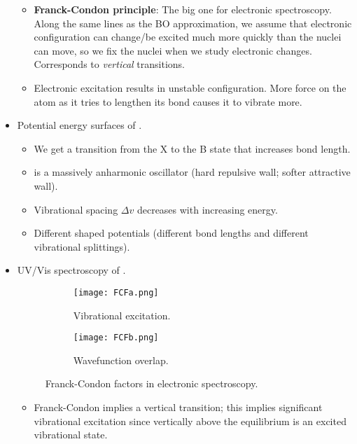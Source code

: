 \documentclass[../notes.tex]{subfiles}
\begin{document}
\begin{itemize}
\begin{itemize}
        \item \textbf{Franck-Condon principle}: The big one for electronic spectroscopy. Along the same lines as the BO approximation, we assume that electronic configuration can change/be excited much more quickly than the nuclei can move, so we fix the nuclei when we study electronic changes. Corresponds to \emph{vertical} transitions.
        \item Electronic excitation results in unstable configuration. More force on the atom as it tries to lengthen its bond causes it to vibrate more.
    \end{itemize}
    \item Potential energy surfaces of .
    \begin{itemize}
        \item We get a transition from the X to the B state that increases bond length.
        \item {} is a massively anharmonic oscillator (hard repulsive wall; softer attractive wall).
        \item Vibrational spacing $\Delta v$ decreases with increasing energy.
        \item Different shaped potentials (different bond lengths and different vibrational splittings).
    \end{itemize}
    \item UV/Vis spectroscopy of .
    \begin{figure}[h!]
        \centering
        \begin{subfigure}[b]{0.49\linewidth}
            \centering
            \texttt{[image: FCFa.png]}
            \caption{Vibrational excitation.}
            \label{fig:FCFa}
        \end{subfigure}
        \begin{subfigure}[b]{0.49\linewidth}
            \centering
            \texttt{[image: FCFb.png]}
            \caption{Wavefunction overlap.}
            \label{fig:FCFb}
        \end{subfigure}
        \caption{Franck-Condon factors in electronic spectroscopy.}
        \label{fig:FCF}
    \end{figure}
    \begin{itemize}
        \item Franck-Condon implies a vertical transition; this implies significant vibrational excitation since vertically above the equilibrium is an excited vibrational state.
        \begin{itemize}

\end{itemize}
\end{itemize}
\end{itemize}
\end{document}
